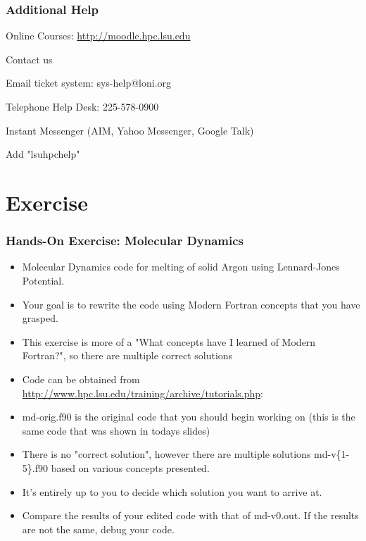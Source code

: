 \documentclass[c,mathserif,compress,xcolor=svgnames]{beamer}
\newcommand*\vardiamond{\textcolor{tigerspurple}{%
  \ensuremath{\blacklozenge}}}
\begin{document}
\begin{frame}
  \frametitle{Additional Help}
  \begin{itemize}
    \item Online Courses: \url{http://moodle.hpc.lsu.edu}
    \item Contact us
    \begin{enumerate}
      {\scriptsize
        \item[$\vardiamond$]Email ticket system: sys-help@loni.org
        \item[$\vardiamond$]Telephone Help Desk: 225-578-0900
        \item[$\vardiamond$]Instant Messenger (AIM, Yahoo Messenger, Google Talk)
        \begin{enumerate}
          {\scriptsize
            \item[$\bigstar$]Add "lsuhpchelp"
          }
        \end{enumerate}
      }
    \end{enumerate}
  \end{itemize}
\end{frame}

\section{Exercise}
\begin{frame}
  \frametitle{\small Hands-On Exercise: Molecular Dynamics}
  \begin{itemize}
    \item Molecular Dynamics code for melting of solid Argon using Lennard-Jones Potential.
    \item Your goal is to rewrite the code using Modern Fortran concepts that you have grasped.
    \item This exercise is more of a "What concepts have I learned of Modern Fortran?", so there are multiple correct solutions
    \item Code can be obtained from \url{http://www.hpc.lsu.edu/training/archive/tutorials.php}:
    \item md-orig.f90 is the original code that you should begin working on (this is the same code that was shown in todays slides)
    \item There is no "correct solution", however there are multiple solutions md-v\{1-5\}.f90 based on various concepts presented.
    \item It's entirely up to you to decide which solution you want to arrive at.
    \item Compare the results of your edited code with that of md-v0.out. If the results are not the same, debug your code.
  \end{itemize}
\end{frame}
\end{document}
